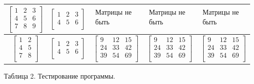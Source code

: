 \documentclass[a4paper,14pt]{article} %
\begin{document}
\begin{center}
\begin{tabular}{ | c | c | c | c | c |}
			$\begin{bmatrix} 
   			1&2&3 \\
    			4&5&6 \\ 
   			7&8&9 \\ 
			\end{bmatrix}$ & 
			$\begin{bmatrix} 
   			1&2&3 \\
    			4&5&6 \\ 
			\end{bmatrix}$ &
			$\begin{matrix} 
   			\text{Матрицы не могут} \\
    			\text{быть перемножены} \\ 
			\end{matrix} $ &
			$\begin{matrix} 
   			\text{Матрицы не могут} \\
    			\text{быть перемножены} \\ 
			\end{matrix} $ &
			$\begin{matrix} 
   			\text{Матрицы не могут} \\
    			\text{быть перемножены}\\ 
			\end{matrix} $ \\ \hline
			
			$\begin{bmatrix} 
   			1&2 \\
    			4&5 \\ 
   			7&8 \\ 
			\end{bmatrix}$ & 
			$\begin{bmatrix} 
   			1&2&3 \\
    			4&5&6 \\ 
			\end{bmatrix}$ &
			$\begin{bmatrix} 
   			9&12&15 \\
    			24&33&42 \\ 
   			39&54&69 \\ 
			\end{bmatrix} $ &
			$\begin{bmatrix} 
   			9&12&15 \\
    			24&33&42 \\ 
   			39&54&69 \\ 
			\end{bmatrix} $ &
			$\begin{bmatrix} 
   			9&12&15 \\
    			24&33&42 \\ 
   			39&54&69 \\ 
			\end{bmatrix} $ \\ \hline
		\end{tabular}
		
		\hfill
		
		Таблица 2.
		Тестирование программы.  
	\end{center}
	
\end{document}
